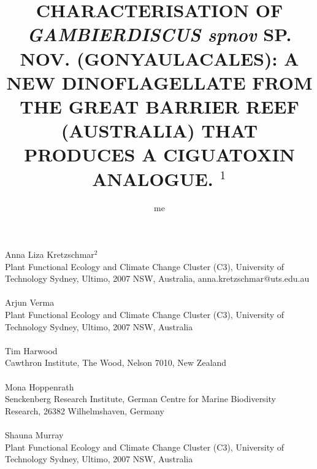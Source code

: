 \documentclass[12pt]{article}
\title{CHARACTERISATION OF \emph{GAMBIERDISCUS spnov} SP. NOV. (GONYAULACALES): A NEW DINOFLAGELLATE FROM THE GREAT BARRIER REEF (AUSTRALIA) THAT PRODUCES A CIGUATOXIN ANALOGUE. $^{1}$}
\author{me}
\date{}
\begin{document}
\maketitle
\paragraph{}Anna Liza Kretzschmar$^{2}$\\
Plant Functional Ecology and Climate Change Cluster (C3), University of Technology Sydney, Ultimo, 2007 NSW, Australia, anna.kretzschmar@uts.edu.au
\paragraph{}Arjun Verma \\
Plant Functional Ecology and Climate Change Cluster (C3), University of Technology Sydney, Ultimo, 2007 NSW, Australia
\paragraph{}Tim Harwood\\ 
Cawthron Institute, The Wood, Nelson 7010, New Zealand
\paragraph{}Mona Hoppenrath\\
Senckenberg Research Institute, German Centre for Marine Biodiversity Research, 26382 Wilhelmshaven, Germany
\paragraph{}Shauna Murray\\ 
Plant Functional Ecology and Climate Change Cluster (C3), University of Technology Sydney, Ultimo, 2007 NSW, Australia
\newpage
\end{document}
